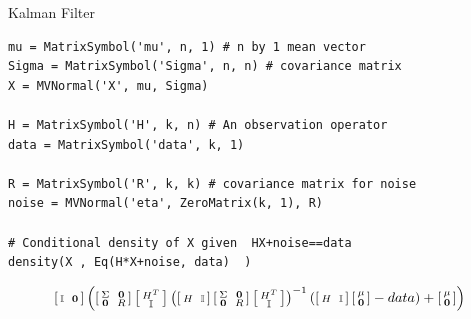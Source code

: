 \documentclass[compress, blue]{beamer}
\begin{document}
\begin{frame}{Kalman Filter}
\begin{lstlisting}
mu = MatrixSymbol('mu', n, 1) # n by 1 mean vector
Sigma = MatrixSymbol('Sigma', n, n) # covariance matrix
X = MVNormal('X', mu, Sigma) 

H = MatrixSymbol('H', k, n) # An observation operator
data = MatrixSymbol('data', k, 1)

R = MatrixSymbol('R', k, k) # covariance matrix for noise
noise = MVNormal('eta', ZeroMatrix(k, 1), R)

# Conditional density of X given  HX+noise==data
density(X , Eq(H*X+noise, data)  ) 
\end{lstlisting}

\vspace{-30pt}
$$\left[\begin{smallmatrix}\mathbb{I} && \bold{0}\end{smallmatrix}\right] \left(\left[\begin{smallmatrix}\Sigma && \bold{0}\\\bold{0} && R\end{smallmatrix}\right] \left[\begin{smallmatrix}H^T\\\mathbb{I}\end{smallmatrix}\right] \left(\left[\begin{smallmatrix}H && \mathbb{I}\end{smallmatrix}\right] \left[\begin{smallmatrix}\Sigma && \bold{0}\\\bold{0} && R\end{smallmatrix}\right] \left[\begin{smallmatrix}H^T\\\mathbb{I}\end{smallmatrix}\right]\right)^{-1} \left( \left[\begin{smallmatrix}H && \mathbb{I}\end{smallmatrix}\right] \left[\begin{smallmatrix}\mu\\\bold{0}\end{smallmatrix}\right] - data\right) + \left[\begin{smallmatrix}\mu\\\bold{0}\end{smallmatrix}\right]\right)$$


\end{frame}
\end{document}
